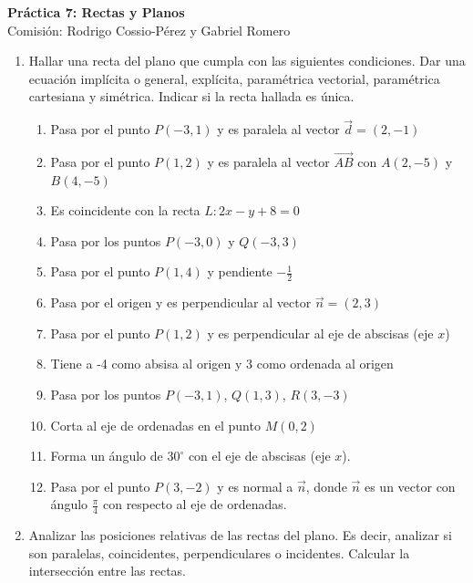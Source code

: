 \documentclass[a4paper]{article}
\newcommand{\exercise}{\item}
\begin{document}
\noindent \hrulefill 
\vspace{-7pt}
\begin{center} 
	\textbf{ Práctica 7: Rectas y Planos } \\
	Comisión: Rodrigo Cossio-Pérez y Gabriel Romero
\end{center}
\vspace{-10pt}
\hrulefill
\begin{enumerate}
	\exercise Hallar una recta del plano que cumpla con las siguientes condiciones. Dar una ecuación implícita o general, explícita, paramétrica vectorial, paramétrica cartesiana y simétrica. Indicar si la recta hallada es única.
	\begin{enumerate} [label=(\alph*)]
		\item Pasa por el punto $P(-3,1)$ y es paralela al vector $\vec{d}=(2,-1)$
		\item Pasa por el punto $P(1,2)$ y es paralela al vector $\overrightarrow{AB}$ con $A(2,-5)$ y $B(4,-5)$
		\item Es coincidente con la recta $L: 2x-y+8=0$
		\item Pasa por los puntos $P(-3,0)$ y $Q(-3,3)$
		\item Pasa por el punto $P(1,4)$ y pendiente $\displaystyle{-\frac{1}{2}}$
		\item Pasa por el origen y es perpendicular al vector $\vec{n}=(2,3)$
		\item Pasa por el punto $P(1,2)$ y es perpendicular al eje de abscisas (eje $x$)
		\item Tiene a -4 como absisa al origen y 3 como ordenada al origen
		\item Pasa por los puntos $P(-3,1)$, $Q(1,3)$, $R(3,-3)$
		\item Corta al eje de ordenadas en el punto $M(0,2)$
		\item Forma un ángulo de $30^{\circ}$ con el eje de abscisas (eje $x$).
		\item Pasa por el punto $P(3,-2)$ y es normal a $\vec{n}$, donde $\vec{n}$ es un vector con ángulo $\displaystyle\frac{\pi}{4}$ con respecto al eje de ordenadas.
	\end{enumerate}
	\exercise Analizar las posiciones relativas de las rectas del plano. Es decir, analizar si son paralelas, coincidentes, perpendiculares o incidentes. Calcular la intersección entre las rectas.
	\begin{enumerate} [label=(\alph*)]

\end{enumerate}
\end{enumerate}
\end{document}
